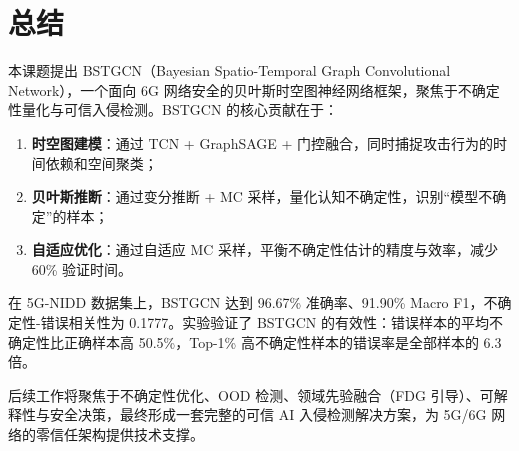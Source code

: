 \section{总结}

本课题提出 BSTGCN（Bayesian Spatio-Temporal Graph Convolutional Network），一个面向 6G 网络安全的贝叶斯时空图神经网络框架，聚焦于不确定性量化与可信入侵检测。BSTGCN 的核心贡献在于：

\begin{enumerate}
  \item \textbf{时空图建模}：通过 TCN + GraphSAGE + 门控融合，同时捕捉攻击行为的时间依赖和空间聚类；
  \item \textbf{贝叶斯推断}：通过变分推断 + MC 采样，量化认知不确定性，识别``模型不确定''的样本；
  \item \textbf{自适应优化}：通过自适应 MC 采样，平衡不确定性估计的精度与效率，减少 60\% 验证时间。
\end{enumerate}

在 5G-NIDD 数据集上，BSTGCN 达到 96.67\% 准确率、91.90\% Macro F1，不确定性-错误相关性为 0.1777。实验验证了 BSTGCN 的有效性：错误样本的平均不确定性比正确样本高 50.5\%，Top-1\% 高不确定性样本的错误率是全部样本的 6.3 倍。

后续工作将聚焦于不确定性优化、OOD 检测、领域先验融合（FDG 引导）、可解释性与安全决策，最终形成一套完整的可信 AI 入侵检测解决方案，为 5G/6G 网络的零信任架构提供技术支撑。


